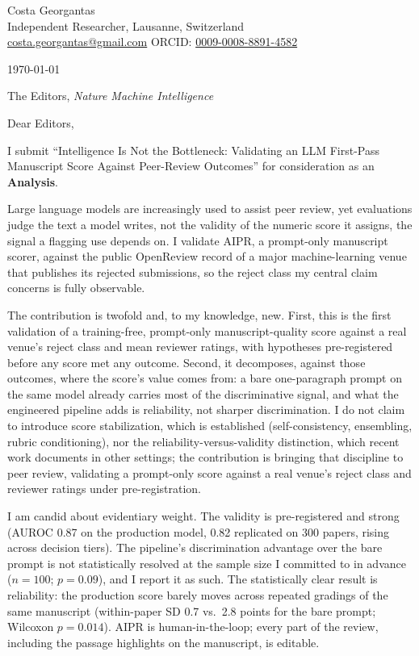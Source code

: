 \documentclass[11pt]{article}
\newcommand{\myname}{Costa Georgantas}
\newcommand{\papertitle}{Intelligence Is Not the Bottleneck: Validating an LLM
  First-Pass Manuscript Score Against Peer-Review Outcomes}
\begin{document}
\noindent
\myname\\
Independent Researcher, Lausanne, Switzerland\\
\href{mailto:costa.georgantas@gmail.com}{costa.georgantas@gmail.com} \quad
ORCID: \href{https://orcid.org/0009-0008-8891-4582}{0009-0008-8891-4582}

\smallskip
\noindent\today

\smallskip
\noindent The Editors, \textit{Nature Machine Intelligence}

\smallskip
\noindent Dear Editors,

I submit ``\papertitle'' for consideration as an \textbf{Analysis}. %

Large language models are increasingly used to assist peer review, yet evaluations judge the
text a model writes, not the validity of the numeric score it assigns, the signal a flagging
use depends on. I validate AIPR, a prompt-only manuscript scorer, against
the public OpenReview record of a major machine-learning venue that publishes its rejected
submissions, so the reject class my central claim concerns is fully observable.

The contribution is twofold and, to my knowledge, new. First, this is the first validation of
a training-free, prompt-only manuscript-quality score against a real venue's reject class and
mean reviewer ratings, with hypotheses pre-registered before any score met any outcome. Second,
it decomposes, against those outcomes, where the score's value comes from: a bare one-paragraph
prompt on the same model already carries most of the discriminative signal, and what the
engineered pipeline adds is reliability, not sharper discrimination. I do not claim to introduce
score stabilization, which is established (self-consistency, ensembling, rubric conditioning),
nor the reliability-versus-validity distinction, which recent work documents in other settings;
the contribution is bringing that discipline to peer review, validating a prompt-only score
against a real venue's reject class and reviewer ratings under pre-registration.

I am candid about evidentiary weight. The validity is pre-registered and strong (AUROC 0.87 on
the production model, 0.82 replicated on 300 papers, rising across decision tiers). The
pipeline's discrimination advantage over the bare prompt is not statistically resolved at the
sample size I committed to in advance ($n=100$; $p=0.09$), and I report it as such. The
statistically clear result is reliability: the production score barely moves across repeated
gradings of the same manuscript (within-paper SD 0.7 vs.\ 2.8 points for the bare prompt;
Wilcoxon $p=0.014$). AIPR is human-in-the-loop; every part of the review, including the passage
highlights on the manuscript, is editable.
\end{document}
